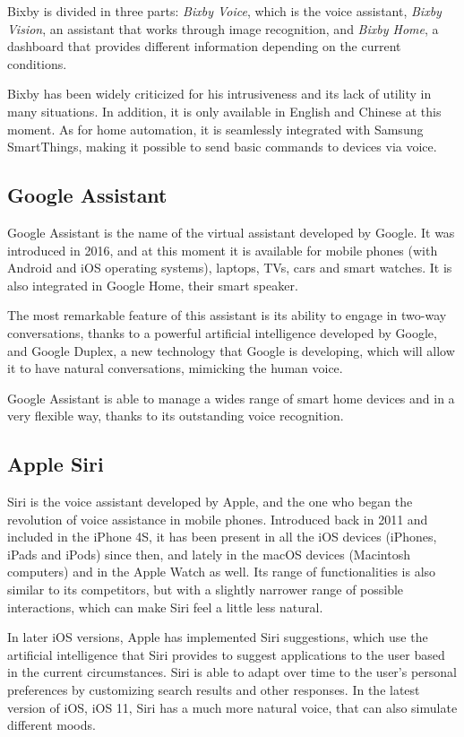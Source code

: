 Bixby is divided in three parts: \textit{Bixby Voice}, which is the voice assistant, \textit{Bixby Vision}, an assistant that works through
image recognition, and \textit{Bixby Home}, a dashboard that provides different information depending on the current 
conditions.\cite{samsungBixby}

Bixby has been widely criticized for his intrusiveness and its lack of utility in many situations. In addition, it is only available in English
and Chinese at this moment. As for home automation, it is seamlessly integrated with Samsung SmartThings, making it possible to send
basic commands to devices via voice.

\subsection{Google Assistant}
Google Assistant is the name of the virtual assistant developed by Google. It was introduced in 2016, and at this moment it is
available for mobile phones (with Android and iOS operating systems), laptops, TVs, cars and smart watches. It is also integrated in 
Google Home, their smart speaker.\cite{googleAssistant}

The most remarkable feature of this assistant is its ability to engage in two-way conversations, thanks to a powerful artificial intelligence
developed by Google, and Google Duplex, a new technology that Google is developing, which will allow it to have natural conversations,
mimicking the human voice.

Google Assistant is able to manage a wides range of smart home devices and in a very flexible way, thanks to its outstanding voice 
recognition.

\subsection{Apple Siri}
Siri is the voice assistant developed by Apple, and the one who began the revolution of voice assistance in mobile phones. Introduced
back in 2011 and included in the iPhone 4S, it has been present in all the iOS devices (iPhones, iPads and iPods) since then, and lately
in the macOS devices (Macintosh computers) and in the Apple Watch as well.\cite{appleIOSSiri} Its range of functionalities is also 
similar to its competitors, but with a slightly narrower range of possible interactions, which can make Siri feel a little less natural.

In later iOS versions, Apple has implemented Siri suggestions, which use the artificial intelligence that Siri provides to suggest 
applications to the user based in the current circumstances. Siri is able to adapt over time to the user's personal preferences by 
customizing search results and other responses. In the latest version of iOS, iOS 11, Siri has a much more natural voice, that can
also simulate different moods.

